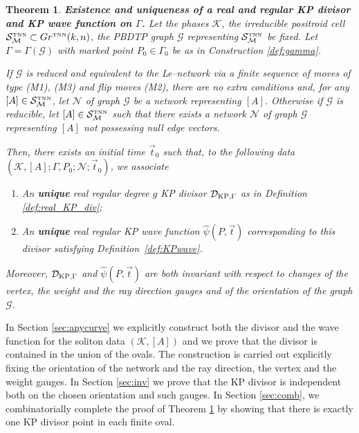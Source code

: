 \documentclass[11pt]{amsart}
\theoremstyle{plain}
\numberwithin{equation}{section}
\newtheorem{theorem}{Theorem}[subsection]
\def \GTNN {{Gr^{\mbox{\tiny TNN}} (k,n)}}
\def \DKP {{\mathcal D}_{\textup{\scriptsize KP},\Gamma}}
\def \S {{\mathcal S}_{\mathcal M}^{\mbox{\tiny TNN}}}
\begin{document}
\begin{theorem}\label{theo:exist}\textbf{Existence and uniqueness of a real and regular KP divisor and KP wave function 
on $\Gamma$.}
Let the phases ${\mathcal K}$, the irreducible positroid cell $\S\subset \GTNN$, the PBDTP graph $\mathcal G$ representing $\S$ be fixed. Let $\Gamma=\Gamma(\mathcal G)$ with marked point $P_0\in \Gamma_0$ be as in Construction \ref{def:gamma}. 

If $\mathcal G$ is reduced and equivalent to the Le--network via a finite sequence of moves of type (M1), (M3) and flip moves (M2), there are no extra conditions and, for any $[A]\in \S$, let $\mathcal N$ of graph $\mathcal G$ be a network representing $[A]$. 
Otherwise if $\mathcal G$ is reducible, let $[A]\in \S$ such that there exists a network $\mathcal N$ of graph $\mathcal G$ representing $[A]$ not possessing null edge vectors.

Then, there exists an initial time $\vec t_0$ such that, to the following data $({\mathcal K}, [A]; \Gamma, P_0; \mathcal N; \vec t_0 )$, we associate
\begin{enumerate}
\item An \textbf{unique} real regular degree $g$ KP divisor $\DKP$ as in Definition \ref{def:real_KP_div};
\item An \textbf{unique} real regular KP wave function $\hat \psi(P, \vec t)$ corresponding to this divisor satisfying Definition~\ref{def:KPwave}.
\end{enumerate}
Moreover, $\DKP$ and $\hat \psi(P, \vec t)$ are both invariant with respect to changes of the vertex, the weight and the ray direction gauges and of the orientation of the graph $\mathcal G$.
\end{theorem}

In Section \ref{sec:anycurve} we explicitly construct both the divisor and the wave function for the soliton data $(\mathcal K, [A])$ and we prove that the divisor is contained in the union of the ovals. The construction is carried out explicitly fixing the orientation of the network and the ray direction, the vertex and the weight gauges. In Section \ref{sec:inv} we prove that the KP divisor is independent both on the chosen orientation and such gauges. In Section \ref{sec:comb}, we combinatorially complete the proof of Theorem \ref{theo:exist} by showing that there is exactly one KP divisor point in each finite oval. 
\end{document}
